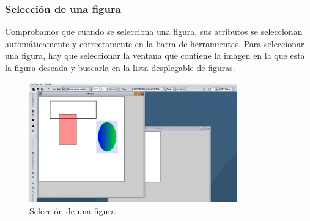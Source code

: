 \subsubsection{Selección de una figura}
Comprobamos que cuando se selecciona una figura, sus atributos se seleccionan automáticamente y correctamente en la barra de herramientas. Para seleccionar una figura, hay que seleccionar la ventana que contiene la imagen en la que está la figura deseada y buscarla en la lista desplegable de figuras.
\vskip0.3cm
\begin{figure}[H]
 \centering
  \includegraphics[width=0.8\textwidth]{graficos/seleccionFigura.jpg}
 \caption{Selección de una figura}
 \label{diseño}
 \end{figure}
